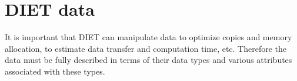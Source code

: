
\chapter{DIET data}
\label{ch:data}

It is important that DIET can manipulate data to optimize copies and
memory allocation, to estimate data transfer and computation time,
etc. Therefore the data must be fully described in terms of their data 
types and various attributes associated with these types.

